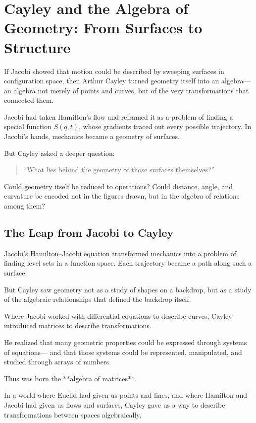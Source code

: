 \section{Cayley and the Algebra of Geometry: From Surfaces to Structure}

If Jacobi showed that motion could be described by sweeping surfaces in configuration space,  
then Arthur Cayley turned geometry itself into an algebra—  
an algebra not merely of points and curves, but of the very transformations that connected them.

Jacobi had taken Hamilton’s flow and reframed it as a problem of finding a special function \( S(q,t) \),  
whose gradients traced out every possible trajectory.  
In Jacobi’s hands, mechanics became a geometry of surfaces.

But Cayley asked a deeper question:

\begin{quote}
“What lies behind the geometry of those surfaces themselves?”
\end{quote}

Could geometry itself be reduced to operations?  
Could distance, angle, and curvature be encoded not in the figures drawn, but in the algebra of relations among them?

\bigskip

\subsection*{The Leap from Jacobi to Cayley}

Jacobi’s Hamilton–Jacobi equation transformed mechanics into a problem of finding level sets in a function space.  
Each trajectory became a path along such a surface.

But Cayley saw geometry not as a study of shapes on a backdrop,  
but as a study of the algebraic relationships that defined the backdrop itself.

Where Jacobi worked with differential equations to describe curves,  
Cayley introduced matrices to describe transformations.

He realized that many geometric properties could be expressed through systems of equations—  
and that those systems could be represented, manipulated, and studied through arrays of numbers.

Thus was born the **algebra of matrices**.

\bigskip

In a world where Euclid had given us points and lines,  
and where Hamilton and Jacobi had given us flows and surfaces,  
Cayley gave us a way to describe transformations between spaces algebraically.

